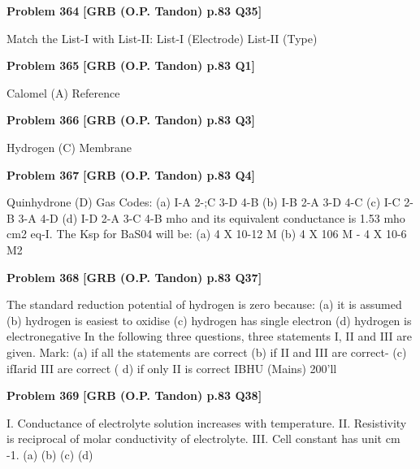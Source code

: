 \begin{problembox}
\textbf{Problem 364} \hfill \textbf{[GRB (O.P. Tandon) p.83 Q35]}
\label{q:ext-grb_all_questions-364}

Match the List-I with List-II: 
List-I (Electrode) 
List-II (Type)
\end{problembox}

\begin{problembox}
\textbf{Problem 365} \hfill \textbf{[GRB (O.P. Tandon) p.83 Q1]}
\label{q:ext-grb_all_questions-365}

Calomel 
(A) Reference
\end{problembox}

\begin{problembox}
\textbf{Problem 366} \hfill \textbf{[GRB (O.P. Tandon) p.83 Q3]}
\label{q:ext-grb_all_questions-366}

Hydrogen 
(C) Membrane
\end{problembox}

\begin{problembox}
\textbf{Problem 367} \hfill \textbf{[GRB (O.P. Tandon) p.83 Q4]}
\label{q:ext-grb_all_questions-367}

Quinhydrone 
(D) Gas 
Codes: 
(a) I-A 
2-;C 
3-D 
4-B 
(b) I-B 
2-A 
3-D 
4-C 
(c) I-C 
2-B 
3-A 
4-D 
(d) I-D 
2-A 
3-C 
4-B 
mho 
and its equivalent conductance is 1.53 
mho cm2 eq-I. The Ksp for BaS04 will be: 
(a) 4 X 10-12 M 
(b) 4 X 106 M -
4 X 10-6 M2
\end{problembox}

\begin{problembox}
\textbf{Problem 368} \hfill \textbf{[GRB (O.P. Tandon) p.83 Q37]}
\label{q:ext-grb_all_questions-368}

The standard reduction potential of hydrogen is zero because: 
(a) it is assumed 
(b) hydrogen is easiest to oxidise 
(c) hydrogen has single electron 
(d) hydrogen is electronegative 
In the following three questions, three statements I, II and III are 
given. Mark: 
(a) if all the statements are correct 
(b) if II and III are correct-
(c) ifIarid III are correct 
( d) if only II is correct 
IBHU (Mains) 200'll
\end{problembox}

\begin{problembox}
\textbf{Problem 369} \hfill \textbf{[GRB (O.P. Tandon) p.83 Q38]}
\label{q:ext-grb_all_questions-369}

I. Conductance of electrolyte solution increases with 
temperature. 
II. Resistivity is reciprocal of molar conductivity of 
electrolyte. 
III. Cell constant has unit cm -1. 
(a) 
(b) 
(c) 
(d)
\end{problembox}

